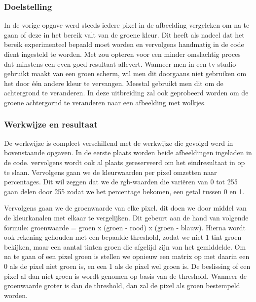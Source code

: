 		\subsubsection{Doelstelling}
			
			\par In de vorige opgave werd steeds iedere pixel in de afbeelding vergeleken om na te gaan of deze in het bereik valt van de groene kleur. Dit heeft als nadeel dat het 
			bereik experimenteel bepaald moet worden en vervolgens handmatig in de code dient ingesteld te worden. Met zou opteren voor een minder omslachtig proces dat minstens een 
			even goed resultaat aflevert. Wanneer men in een tv-studio gebruikt maakt van een groen scherm, wil men dit doorgaans niet gebruiken om het door \'e\'en andere kleur te 
			vervangen. Meestal gebruikt men dit om de achtergrond te veranderen. In deze uitbreiding zal ook geprobeerd worden om de groene achtergornd te veranderen naar een afbeelding
			met wolkjes. 
			
			\newpage 
		\subsubsection{Werkwijze en resultaat}
			
			\par De werkwijze is compleet verschillend met de werkwijze die gevolgd werd in bovenstaande opgaven. In de eerste plaats worden beide afbeeldingen ingeladen in de code. 
			vervolgens wordt ook al plaats gereserveerd om het eindresultaat in op te slaan. Vervolgens gaan we de kleurwaarden per pixel omzetten naar percentages. Dit wil zeggen dat
			we de rgb-waarden die vari\"eren van 0 tot 255 gaan delen door 255 zodat we het percentage bekomen, een getal tussen 0 en 1. \noindent \bigskip
			
			\par Vervolgens gaan we de groenwaarde van elke pixel. dit doen we door middel van de kleurkanalen met elkaar te vergelijken. Dit gebeurt aan de hand van volgende formule:
			groenwaarde = groen x (groen - rood) x (groen - blauw). Hierna wordt ook rekening gehouden met een bepaalde threshold, zodat we niet 1 tint groen bekijken, maar een aantal tinten
			groen die afgelijd zijn van het gemiddelde. Om na te gaan of een pixel groen is stellen we opnieuw een matrix op met daarin een 0 als de pixel niet groen is, en een 1 als de
			pixel wel groen is. De beslissing of een pixel al dan niet groen is wordt genomen op basis van de threshold. Wanneer de groenwaarde groter is dan de threshold, dan zal de pixel
			als groen bestempeld worden. \noindent \bigskip 
			
